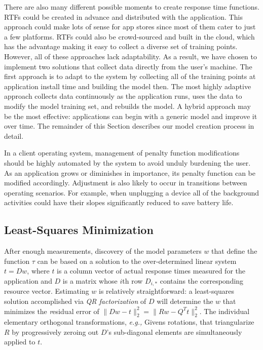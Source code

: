 There are also many different possible moments to create response time functions.  RTFs could be created in advance and distributed with the application. This approach could make lots of sense for app stores since most of them cater to just a few platforms. RTFs could also be crowd-sourced and built in the cloud, which has the advantage making it easy to collect a diverse set of training points.  However, all of these approaches lack adaptability.  As a result, we have chosen to implement two solutions that collect data directly from the user's machine.  The first approach is to adapt to the system by collecting all of the training points at application install time and building the model then.  The most highly adaptive approach collects data continuously as the application runs, uses the data to modify the model training set, and rebuilds the model.  A hybrid approach may be the most effective: applications can begin with a generic model and improve it over time. The remainder of this Section describes our model creation process in detail.

In a client operating system, management of penalty function modifications
should be highly automated by the system to avoid unduly burdening the user.
As an application grows or diminishes in importance, its penalty function can be modified accordingly.
Adjustment is also likely to occur in transitions between operating scenarios.
For example, when unplugging a device all of the background activities could have their slopes significantly reduced to save battery life.

\subsection*{Least-Squares Minimization}
After enough measurements, discovery of the model parameters $w$ that define the function $\tau$
can be based on a solution to the over-determined linear system $t=Dw$,
where $t$ is a column vector of actual response times measured for the application
and $D$ is a matrix whose $i$th row $D_{i,*}$ contains the corresponding resource vector.
Estimating $w$ is relatively straightforward: a least-squares solution accomplished via
\emph{QR factorization}\cite{GoVL} of $D$ will determine the $w$ that minimizes the \emph residual error of
$\|Dw - t\|^2_2 =  \|Rw - Q^Tt\|^2_2$.
%
The individual elementary orthogonal transformations, \emph{e.g.,} Givens rotations,
that triangularize $R$ by progressively zeroing out $D$'s sub-diagonal elements are simultaneously applied to $t$.


